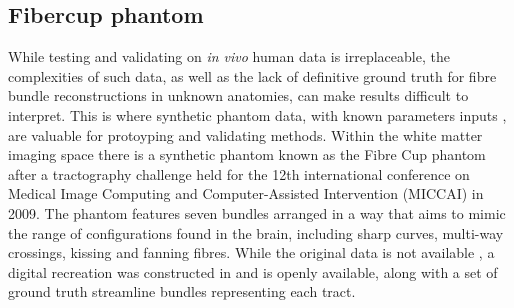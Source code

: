 \subsection{Fibercup phantom}

While testing and validating on \textit{in vivo} human data is irreplaceable, the complexities of such data, as well as the lack of definitive ground truth for fibre bundle reconstructions in unknown anatomies, can make results difficult to interpret.
This is where synthetic phantom data, with known parameters inputs , are valuable for protoyping and validating methods.
Within the white matter imaging space there is a synthetic phantom known as the Fibre Cup phantom after a tractography challenge held for the 12th international conference on Medical Image Computing and Computer-Assisted Intervention (MICCAI) in 2009.
The phantom features seven bundles arranged in a way that aims to mimic the range of configurations found in the brain, including sharp curves, multi-way crossings, kissing and fanning fibres.
While the original data is not available , a digital recreation was constructed in  and is openly available, along with a set of ground truth streamline bundles representing each tract.

